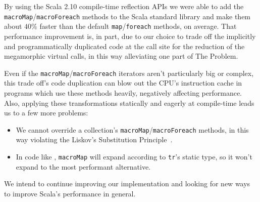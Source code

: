 \label{conclusions}

By using the Scala 2.10 compile-time reflection APIs we were able to add the \texttt{macroMap}/\texttt{macroForeach} methods to the Scala standard library and make them about $40\%$ faster than the default \texttt{map}/\texttt{foreach} methods, on average. That performance improvement is, in part, due to our choice to trade off the implicitly and programmatically duplicated code at the call site for the reduction of the megamorphic virtual calls, in this way alleviating one part of The Problem.

Even if the \texttt{macroMap}/\texttt{macroForeach} iterators aren't particularly big or complex, this trade off's code duplication can blow out the CPU's instruction cache in programs which use these methods heavily, negatively affecting performance. Also, applying these transformations statically and eagerly at compile-time leads us to a few more problems:

\begin{itemize}
 \item We cannot override a collection's \texttt{macroMap}/\texttt{macroForeach} methods, in this way violating the Liskov's Substitution Principle~\cite{liskov1994behavioral}.
 \item In code like , \texttt{macroMap} will expand according to \texttt{tr}'s static type, so it won't expand to the most performant alternative.
\end{itemize}

We intend to continue improving our implementation and looking for new ways to improve Scala's performance in general.
